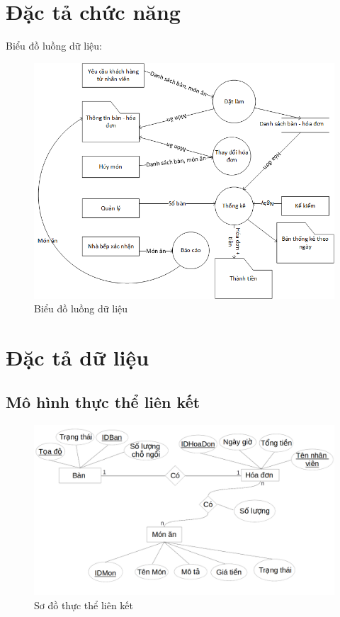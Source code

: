 \documentclass[a4paper,12pt]{report}
\begin{document}
\section{Đặc tả chức năng}
Biểu đồ luồng dữ liệu:\\
\begin{figure}[h]
\centering
\includegraphics[scale=0.7]{DFD.png}
\caption{Biểu đồ luồng dữ liệu}
\end{figure}

\section{Đặc tả dữ liệu}
\subsection{Mô hình thực thể liên kết}
\begin{figure}
\centering
\includegraphics[scale=0.4]{DuLieu.png}
\caption{Sơ đồ thực thể liên kết}
\end{figure}
\end{document}
